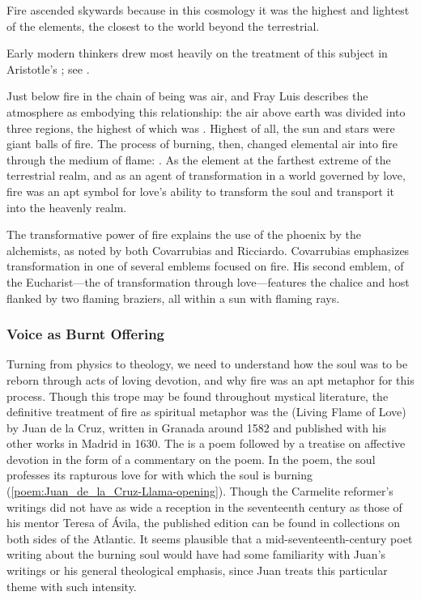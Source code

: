 Fire ascended skywards because in this cosmology it was the highest and
lightest of the elements, the closest to the world beyond the terrestrial.%
\begin{Footnote}
    Early modern thinkers drew most heavily on the treatment of this subject in
    Aristotle's ; see \autocite{Lang:AristotleMedieval}.
\end{Footnote}
Just below fire in the chain of being was air, and Fray Luis describes the
atmosphere as embodying this relationship: the air above earth was divided into
three regions, the highest of which was .%
    \Autocite[207]{LuisdeGranada:Simbolo}
Highest of all, the sun and stars were giant balls of fire.%
    \Autocite[\XXX]{LuisdeGranada:Simbolo}
The process of burning, then, changed elemental air into fire through the
medium of flame: .%
    \Autocite[205]{LuisdeGranada:Simbolo}
As the element at the farthest extreme of the terrestrial realm, and as an
agent of transformation in a world governed by love, fire was an apt symbol for
love's ability to transform the soul and transport it into the heavenly realm.%
\begin{Footnote}
    The transformative power of fire explains the use of the phoenix by the
    alchemists, as noted by both Covarrubias and Ricciardo.  Covarrubias
    emphasizes transformation in one of several emblems focused on fire.
    His second emblem, of the Eucharist---the  of
    transformation through love---features the chalice and host flanked by two
    flaming braziers, all within a sun with flaming rays.
\end{Footnote}

\subsubsection{Voice as Burnt Offering}
Turning from physics to theology, we need to understand how the soul was to
be reborn through acts of loving devotion, and why fire was an apt metaphor
for this process.
Though this trope may be found throughout mystical literature, the definitive
treatment of fire as spiritual metaphor was the 
(Living Flame of Love) by Juan de la Cruz, written in Granada around 1582 and
published with his other works in Madrid in 1630.
The  is a poem followed by a treatise on affective
devotion in the form of a commentary on the poem.
In the poem, the soul professes its rapturous love for  with which the soul is burning
(\cref{poem:Juan_de_la_Cruz-Llama-opening}).
Though the Carmelite reformer's writings did not have as wide a reception in
the seventeenth century as those of his mentor Teresa of Ávila, the published
edition can be found in collections on both sides of the Atlantic.
It seems plausible that a mid-seventeenth-century poet writing about the
burning soul would have had some familiarity with Juan's writings or his
general theological emphasis, since Juan treats this particular theme with such
intensity.

